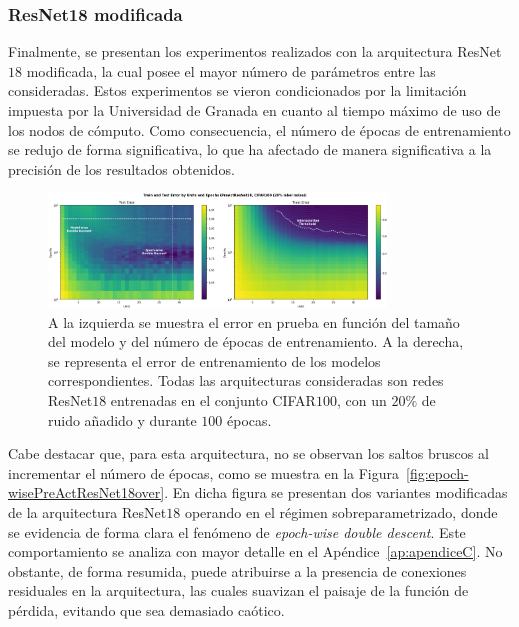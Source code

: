 \subsubsection{ResNet18 modificada}\label{subsubsec:model-epoch-wise-ResNet18 modificada}

Finalmente, se presentan los experimentos realizados con la arquitectura ResNet$18$ modificada, la cual posee el mayor número de parámetros entre las consideradas. Estos experimentos se vieron condicionados por la limitación impuesta por la Universidad de Granada en cuanto al tiempo máximo de uso de los nodos de cómputo. Como consecuencia, el número de épocas de entrenamiento se redujo de forma significativa, lo que ha afectado de manera significativa a la precisión de los resultados obtenidos.\newline

\begin{figure}[h]
    \centering
    \includegraphics[width=0.8\textwidth]{img/experiments/model-epochPreActResNet18CIFAR100.png}
    \caption[Doble descenso en función del tamaño del modelo y del número de épocas para la red ResNet$18$ y el conjunto CIFAR$100$.]{A la izquierda se muestra el error en prueba en función del tamaño del modelo y del número de épocas de entrenamiento. A la derecha, se representa el error de entrenamiento de los modelos correspondientes. Todas las arquitecturas consideradas son redes ResNet$18$ entrenadas en el conjunto CIFAR$100$, con un $20\%$ de ruido añadido y durante $100$ épocas.}\label{fig:model-epochPreActResNet18CIFAR100}
\end{figure}

Cabe destacar que, para esta arquitectura, no se observan los saltos bruscos al incrementar el número de épocas, como se muestra en la Figura~\ref{fig:epoch-wisePreActResNet18over}. En dicha figura se presentan dos variantes modificadas de la arquitectura ResNet$18$ operando en el régimen sobreparametrizado, donde se evidencia de forma clara el fenómeno de \textit{epoch-wise double descent}. Este comportamiento se analiza con mayor detalle en el Apéndice~\ref{ap:apendiceC}. No obstante, de forma resumida, puede atribuirse a la presencia de conexiones residuales en la arquitectura, las cuales suavizan el paisaje de la función de pérdida, evitando que sea demasiado caótico.\newline

